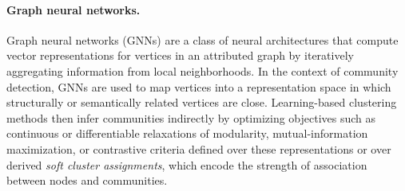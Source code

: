 \documentclass[../paper.tex]{subfiles}
\begin{document}
\paragraph*{\textbf{Graph neural networks}.}
Graph neural networks (GNNs) are a class of neural architectures that compute vector representations for vertices in an attributed graph by iteratively aggregating information from local neighborhoods.
In the context of community detection, GNNs are used to map vertices into a representation space in which structurally or semantically related vertices are close.
Learning-based clustering methods then infer communities indirectly by optimizing objectives such as continuous or differentiable relaxations of modularity, mutual-information maximization,
or contrastive criteria defined over these representations or over derived \emph{soft cluster assignments}, which encode the strength of association between nodes and communities.

\ifSubfilesClassLoaded{%
}{}
\end{document}
